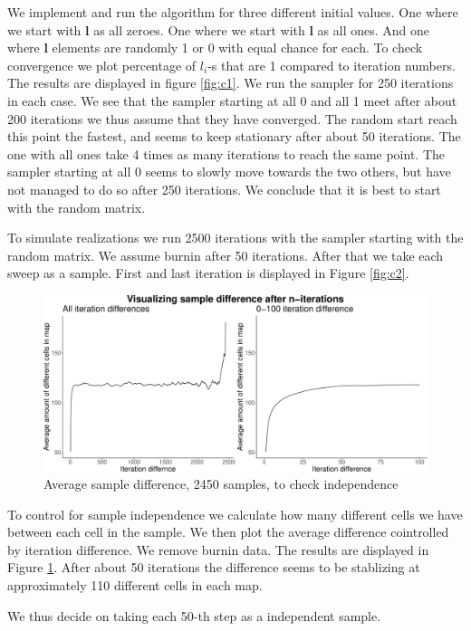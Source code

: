 \documentclass[]{article}
\newcommand{\vect}[1]{\ensuremath{\boldsymbol{\mathbf{#1}}}}
\begin{document}
We implement and run the algorithm for three different initial values.
One where we start with \(\vect l\) as all zeroes. One where we start
with \(\vect l\) as all ones. And one where \(\vect l\) elements are
randomly 1 or 0 with equal chance for each. To check convergence we plot
percentage of \(l_i\)-s that are 1 compared to iteration numbers. The
results are displayed in figure \ref{fig:c1}. We run the sampler for 250
iterations in each case. We see that the sampler starting at all 0 and
all 1 meet after about 200 iterations we thus assume that they have
converged. The random start reach this point the fastest, and seems to
keep stationary after about 50 iterations. The one with all ones take 4
times as many iterations to reach the same point. The sampler starting
at all 0 seems to slowly move towards the two others, but have not
managed to do so after 250 iterations. We conclude that it is best to
start with the random matrix.

To simulate realizations we run 2500 iterations with the sampler
starting with the random matrix. We assume burnin after 50 iterations.
After that we take each sweep as a sample. First and last iteration is
displayed in Figure \ref{fig:c2}.

\begin{figure}
\centering
\includegraphics{Exercise-3_files/figure-latex/fig1c3-1.pdf}
\caption{\label{fig:c3} Average sample difference, 2450 samples, to
check independence}
\end{figure}

To control for sample independence we calculate how many different cells
we have between each cell in the sample. We then plot the average
difference cointrolled by iteration difference. We remove burnin data.
The results are displayed in Figure \ref{fig:c3}. After about 50
iterations the difference seems to be stablizing at approximately 110
different cells in each map.

We thus decide on taking each 50-th step as a independent sample.
\end{document}
